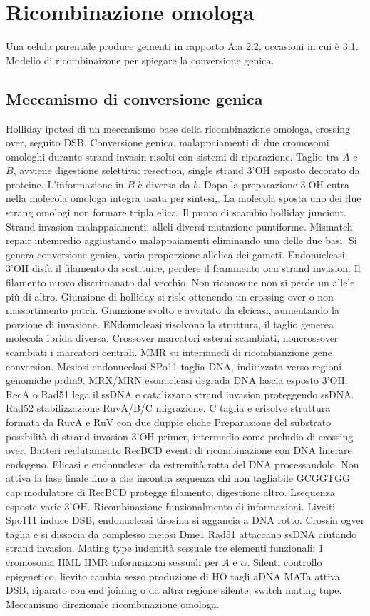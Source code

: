 \chapter{Ricombinazione omologa}
Una celula parentale produce gementi in rapporto A:a 2:2, occasioni in cui \`e 3:1.
Modello di ricombinaizone per spiegare la conversione genica.

\section{Meccanismo di conversione genica}
Holliday ipotesi di un meccanismo base della ricombinazione omologa, crossing over, seguito DSB.
Conversione genica, malappaiamenti di due cromosomi omologhi durante strand invasin risolti con sistemi di riparazione.
Taglio tra $A$ e $B$, avviene digestione selettiva: resection, single strand 3'OH esposto decorato da proteine.
L'informazione in $B$ \`e diversa da $b$.
Dopo la preparazione 3;OH entra nella molecola omologa integra usata per sintesi,.
La molecola sposta uno dei due strang omologi non formare tripla elica.
Il punto di scambio holliday junciont.
Strand invasion malappaiamenti, alleli diversi mutazione puntiforme.
Mismatch repair intemredio aggiustando malappaiamenti eliminando una delle due basi.
Si genera conversione genica, varia proporzione allelica dei gameti.
Endonucleasi 3'OH disfa il filamento da sostituire, perdere il frammento ocn strand invasion.
Il filamento nuovo discrimanato dal vecchio.
Non riconoscue non si perde un allele pi\`u di altro.
Giunzione di holliday si risle ottenendo un crossing over o non riassortimento patch.
Giunzione svolto e avvitato da elcicasi, aumentando la porzione di invasione.
ENdonucleasi risolvono la struttura, il taglio generea molecola ibrida diversa.
Crossover marcatori esterni scambiati, noncrossover scambiati i marcatori centrali.
MMR su intermnedi di ricombianzione gene conversion.
Mesiosi endonucelasi SPo11 taglia DNA, indirizzata verso regioni genomiche prdm9.
MRX/MRN esonucleasi degrada DNA lascia esposto 3'OH.
RecA o Rad51 lega il ssDNA e catalizzano strand invasion proteggendo ssDNA.
Rad52 stabilizzazione RuvA/B/C migrazione. 
C taglia e erisolve struttura formata da RuvA e RuV con due duppie eliche
Preparazione del substrato possbilit\`a di strand invasion 3'OH primer, intermedio come preludio di crossing over.
Batteri reclutamento RecBCD eventi di ricombinazione con DNA linerare endogeno.
Elicasi e endonucleasi da estremit\`a rotta del DNA processandolo.
Non attiva la fase finale fino a che incontra sequenza chi non tagliabile GCGGTGG cap modulatore di RecBCD protegge filamento, digestione altro.
Lsequenza esposte varie 3'OH.
Ricombinazione funzionalmento di informazioni.
Liveiti Spo111 induce DSB, endonucleasi tirosina si aggancia a DNA rotto.
Crossin ogver taglia e si dissocia da complesso meiosi Dme1 Rad51 attaccano ssDNA aiutando strand invasion.
Mating type iudentit\`a sessuale tre elementi funzionali: 1 cromosoma HML HMR informaizoni sessuali per $A$ e $\alpha$.
Silenti controllo epigenetico, lievito cambia sesso produzione di HO tagli aDNA MATa attiva DSB, riparato con end joining o da altra regione silente, switch mating tupe.
Meccanismo direzionale ricombinazione omologa.

